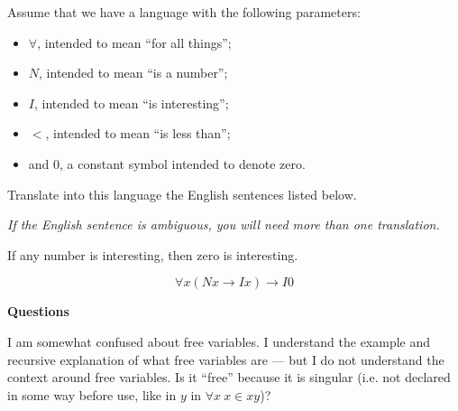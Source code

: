 \documentclass[english, 11pt]{amsart}
\begin{document}
\setlength{\headheight}{13.0pt}
\setlength{\footskip}{15.0pt}


  \begin{problem}
    Assume that we have a language with the following parameters:
    \begin{itemize}
      \item $\forall$, intended to mean ``for all things'';
      \item $N$, intended to mean ``is a number'';
      \item $I$, intended to mean ``is interesting'';
      \item $<$, intended to mean ``is less than'';
      \item and $0$, a constant symbol intended to denote zero.
    \end{itemize}
  Translate into this language the English sentences listed below.
  
  \step
  \emph{If the English sentence is ambiguous,
        you will need more than one translation.}

  \begin{enumalph}
    \setcounter{enumi}{1}
    \item If any number is interesting, then zero is interesting.
    \begin{Answer}
      \[
        \forall x \left( Nx \to Ix \right) \to I0
      \]
    \end{Answer}
  \end{enumalph}
\end{problem}
    \step
    \begin{blockcolor}
      \begin{center}\textbf{Questions} \end{center}

      \step
      I am somewhat confused about free variables.
      I understand the example and recursive explanation of
      what free variables are ---
      but I do not understand the context around free variables.
      Is it ``free'' because it is singular (i.e. not declared in some way
      before use, like in $y$ in $\forall x\ x \in x y$)?
    \end{blockcolor}
\bigskip
\end{document}
